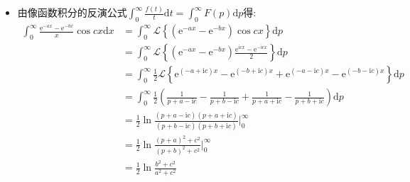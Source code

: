 \documentclass[a4paper,fontset=windows]{ctexart}
\begin{document}
\begin{itemize}
联立解得：
\begin{equation}
\left\{
\begin{array}{lr}
I_1=\frac{EC(1+pCR)}{LCp^2(1+pCR)+pCR)} & \\
I_2=\frac{EC(pCR)}{LCp^2(1+pCR)+pCR)} & 
\end{array}
\right.
\end{equation}
代入初始条件$i(0)=0$,\ $q(0)=0$,\ 对$I_1$进行反演得:
\begin{equation}
i(t)=i_1(t)=\left\{
\begin{array}{lr}
\frac{E}{R}\left(1+A\mathrm{e}^{-\gamma_1t}-B\mathrm{e}^{-\gamma_2t}\right) &k<1 \\
\frac{E}{R}\left(1-\mathrm{e}^{-\alpha t}-\frac{\alpha t}{2}\mathrm{e}^{-\alpha t}\right) &k=1 \\
\frac{E}{R}\left[1-\mathrm{e}^{-\alpha t}(\cos\omega t+\frac{\alpha-\beta}{\omega}\sin\omega t)\right] &k>1
\end{array}
\right.
\end{equation}
其中$\alpha=\frac{1}{2RC}$,\ $\beta=\frac{R}{L}$,\ $k=4R^2\frac{C}{L}$,\ $\gamma_1=\alpha(1-\sqrt{1-k})$,\ $\gamma_2=\alpha(1+\sqrt{1-k})$,\ $A=\frac{\beta-\gamma_2}{\gamma_2-\gamma_1}$,\ $B=\frac{\beta-\gamma_1}{\gamma_2-\gamma_1}$.

\smallskip
\item[6.(1)]
由像函数积分的反演公式$\int_{0}^{\infty}\frac{f(t)}{t}\mathrm{d}t=\int_{0}^{\infty}F(p)\mathrm{d}p$得:
\begin{align*}
\int_{0}^{\infty}\frac{\mathrm{e}^{-ax}-\mathrm{e}^{-bx}}{x}\cos cx\mathrm{d}x
&=\int_{0}^{\infty}\mathscr{L}\left\lbrace\left(\mathrm{e}^{-ax}-\mathrm{e}^{-bx}\right)\cos cx\right\rbrace\mathrm{d}p \\
&=\int_{0}^{\infty}\mathscr{L}\left\lbrace\left(\mathrm{e}^{-ax}-\mathrm{e}^{-bx}\right)\frac{\mathrm{e}^{\mathrm{i}cx}-\mathrm{e}^{-\mathrm{i}cx}}{2}\right\rbrace\mathrm{d}p \\
&=\int_{0}^{\infty}\frac{1}{2}\mathscr{L}\left\lbrace\mathrm{e}^{(-a+\mathrm{i}c)x}-\mathrm{e}^{(-b+\mathrm{i}c)x}+\mathrm{e}^{(-a-\mathrm{i}c)x}-\mathrm{e}^{(-b-\mathrm{i}c)x}\right\rbrace\mathrm{d}p \\
&=\int_{0}^{\infty}\frac{1}{2}\left(\frac{1}{p+a-\mathrm{i}c}-\frac{1}{p+b-\mathrm{i}c}+\frac{1}{p+a+\mathrm{i}c}-\frac{1}{p+b+\mathrm{i}c}\right)\mathrm{d}p \\
&=\frac{1}{2}\ln\frac{(p+a-\mathrm{i}c)(p+a+\mathrm{i}c)}{(p+b-\mathrm{i}c)(p+b+\mathrm{i}c)}\bigg|_{0}^{\infty} \\
&=\frac{1}{2}\ln\frac{(p+a)^2+c^2}{(p+b)^2+c^2}\bigg|_{0}^{\infty} \\
&=\frac{1}{2}\ln\frac{b^2+c^2}{a^2+c^2}
\end{align*}


\end{itemize}
\end{document}
